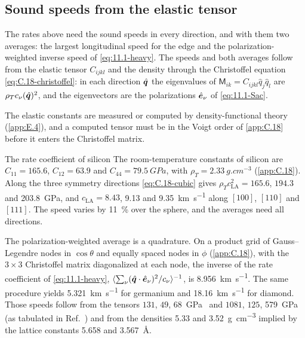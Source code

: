 \subsection{Sound speeds from the elastic tensor}

The rates above need the sound speeds in every direction, and with them two averages: the largest longitudinal speed for the edge and the polarization-weighted inverse speed of \cref{eq:11.1-heavy}. The speeds and both averages follow from the elastic tensor $C_{ijkl}$ and the density through the Christoffel equation \cref{eq:C.18-christoffel}: in each direction $\hat{\bm{q}}$ the eigenvalues of $\mathsf{M}_{ik} = C_{ijkl}\hat q_j\hat q_l$ are $\rho_Tc_\nu(\hat{\bm{q}})^2$, and the eigenvectors are the polarizations $\hat{\bm{e}}_\nu$ of \cref{eq:11.1-Sac}.

The elastic constants are measured or computed by density-functional theory (\cref{app:E.4}), and a computed tensor must be in the Voigt order of \cref{app:C.18} before it enters the Christoffel matrix.

\begin{workedexample}{The rate coefficient of silicon}\label{we:11-cbar}
The room-temperature constants of silicon are $C_{11} = 165.6$, $C_{12} = 63.9$ and $C_{44} = \SI{79.5}{GPa}$, with $\rho_T = \SI{2.33}{g.cm^{-3}}$ (\cref{app:C.18}). Along the three symmetry directions \cref{eq:C.18-cubic} gives $\rho_Tc_{\mathrm{LA}}^2 = 165.6$, $194.3$ and \SI{203.8}{GPa}, and $c_{\mathrm{LA}} = 8.43$, 9.13 and \SI{9.35}{km.s^{-1}} along $[100]$, $[110]$ and $[111]$. The speed varies by \SI{11}{\percent} over the sphere, and the averages need all directions.

The polarization-weighted average is a quadrature. On a product grid of Gauss--Legendre nodes in $\cos\theta$ and equally spaced nodes in $\phi$ (\cref{app:C.18}), with the $3\times3$ Christoffel matrix diagonalized at each node, the inverse of the rate coefficient of \cref{eq:11.1-heavy}, $\langle\sum_\nu(\hat{\bm{q}}\cdot\hat{\bm{e}}_\nu)^2/c_\nu\rangle^{-1}$, is \SI{8.956}{km.s^{-1}}. The same procedure yields \SI{5.321}{km.s^{-1}} for germanium and \SI{18.16}{km.s^{-1}} for diamond. Those speeds follow from the tensors $131$, $49$, \SI{68}{GPa}~\cite{mcskimin1963elastic} and $1081$, $125$, \SI{579}{GPa}~\cite{mcskimin1972elastic} (as tabulated in Ref.~\cite[Table~III]{haxhijaj2026lattice}) and from the densities 5.33 and \SI{3.52}{g.cm^{-3}} implied by the lattice constants 5.658 and \SI{3.567}{\angstrom}.
\end{workedexample}

